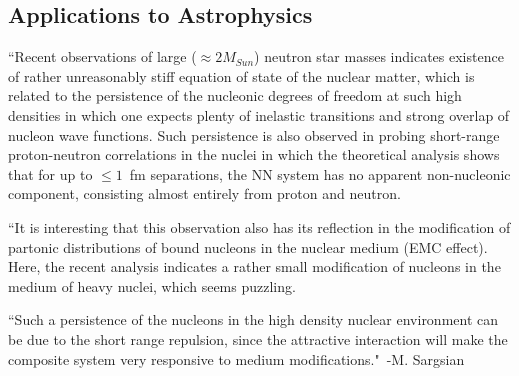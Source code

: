 \subsection{Applications to Astrophysics}
``Recent observations of large ($\approx 2M_{Sun}$) neutron star masses \cite{Demorest:2010bx} indicates existence of rather unreasonably stiff equation of state of the nuclear matter, which is related to the persistence of the nucleonic degrees of freedom \cite{Heiselberg:2000dn} at such high densities in which one expects plenty of inelastic transitions and strong overlap of nucleon wave functions. Such persistence is also observed in probing short-range proton-neutron correlations in the nuclei \cite{Subedi:2008zz,Piasetzky:2006ai} in which the theoretical analysis \cite{Frankfurt:2008zv} shows that for up to $\leq 1$~fm separations, the NN system has no apparent non-nucleonic component, consisting almost entirely from proton and neutron.

``It is interesting that this observation also has its reflection in the modification of partonic distributions of bound nucleons in the nuclear medium (EMC effect). Here, the recent analysis \cite{Frankfurt:2012qs} indicates a rather small modification of nucleons in the medium of heavy nuclei, which seems puzzling.

``Such a persistence of the nucleons in the high density nuclear environment can be due to the short range repulsion, since the attractive interaction will make the composite system very responsive to medium modifications."~-M. Sargsian~\cite{Sargsian:2014bwa}